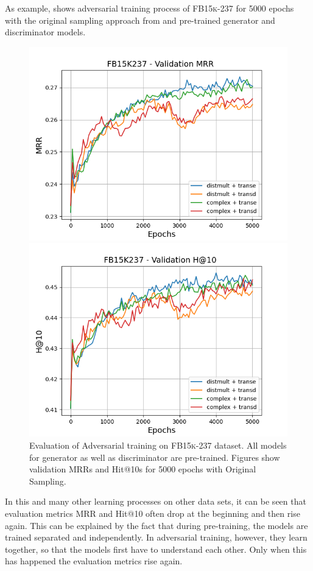 As example,  shows adversarial training process of \textsc{FB15k-237} for 5000 epochs with the original sampling approach from \kbgan and pre-trained  generator and discriminator models.
\begin{figure}
    \centering
    \begin{minipage}{.5\textwidth}
      \centering
      \includegraphics[width=0.9\linewidth]{figures/results/gan_train/pretrained/random/fb15k237/gan_train_random_fb15k237_mrrs.png}
    \end{minipage}%
    \begin{minipage}{.5\textwidth}
      \centering
      \includegraphics[width=0.9\linewidth]{figures/results/gan_train/pretrained/random/fb15k237/gan_train_random_fb15k237_hit10s.png}
    \end{minipage}
    \caption{Evaluation of Adversarial training on \textsc{FB15k-237} dataset.
    All models for generator as well as discriminator are pre-trained.
    Figures show validation MRRs and Hit@10s for 5000 epochs with Original Sampling.}
    \label{fig:original_pretrained_advtrain}
\end{figure}
In this and many other learning processes on other data sets, it can be seen that evaluation metrics MRR and Hit@10 often drop at the beginning and then rise again.
This can be explained by the fact that during pre-training, the models are trained separated and independently.
In adversarial training, however, they learn together, so that the models first have to understand each other.
Only when this has happened the evaluation metrics rise again.

